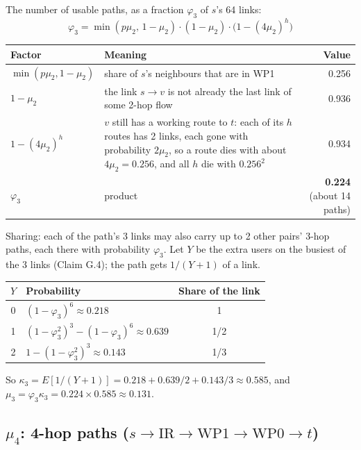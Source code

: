\documentclass[11pt]{article}
\begin{document}
The number of usable paths, as a fraction $\varphi_3$ of $s$'s 64 links:
\[
\varphi_3 = \min(p \mu_2,\, 1 - \mu_2) \cdot (1 - \mu_2) \cdot \big(1 - (4 \mu_2)^h\big)
\]

\begin{center}
\begin{tabularx}{\linewidth}{@{}l L r@{}}
\toprule
Factor & Meaning & Value \\
\midrule
$\min(p\mu_2, 1 - \mu_2)$ & share of $s$'s neighbours that are in WP1 & 0.256 \\
$1 - \mu_2$ & the link $s \to v$ is not already the last link of some 2-hop flow & 0.936 \\
$1 - (4\mu_2)^h$ & $v$ still has a working route to $t$: each of its $h$ routes has 2 links, each gone with probability $2\mu_2$, so a route dies with about $4\mu_2 = 0.256$, and all $h$ die with $0.256^2$ & 0.934 \\
$\varphi_3$ & product & \textbf{0.224} (about 14 paths) \\
\bottomrule
\end{tabularx}
\end{center}

Sharing: each of the path's 3 links may also carry up to 2 other pairs' 3-hop paths, each there with probability $\varphi_3$. Let $Y$ be the extra users on the busiest of the 3 links (Claim G.4); the path gets $1/(Y+1)$ of a link.

\begin{center}
\begin{tabular}{@{}clc@{}}
\toprule
$Y$ & Probability & Share of the link \\
\midrule
0 & $(1 - \varphi_3)^6 \approx 0.218$ & 1 \\
1 & $(1 - \varphi_3^2)^3 - (1 - \varphi_3)^6 \approx 0.639$ & 1/2 \\
2 & $1 - (1 - \varphi_3^2)^3 \approx 0.143$ & 1/3 \\
\bottomrule
\end{tabular}
\end{center}

So $\kappa_3 = E[1/(Y+1)] = 0.218 + 0.639/2 + 0.143/3 \approx \mathbf{0.585}$, and $\mu_3 = \varphi_3 \kappa_3 = 0.224 \times 0.585 \approx \mathbf{0.131}$.

\subsection*{$\mu_4$: 4-hop paths ($s \to \text{IR} \to \text{WP1} \to \text{WP0} \to t$)}
\end{document}
